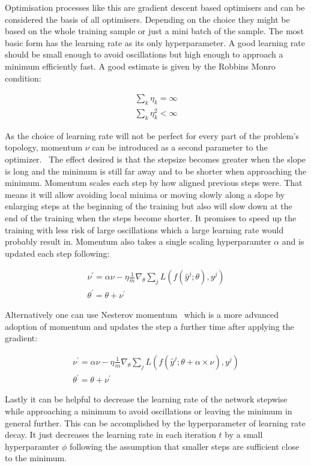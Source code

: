 Optimisation processes like this are gradient descent based optimisers and can be considered the basis of all optimisers. Depending on the choice they might be based on the whole training sample or just a mini batch of the sample. The most basic form has the learning rate as its only hyperparameter. A good learning rate should be small enough to avoid oscillations but high enough to approach a minimum efficiently fast. A good estimate is given by the Robbins Monro condition:

\begin{align}
    \sum_k \eta_k = \infty\\
    \sum_k \eta_k^2 < \infty
\end{align}

As the choice of learning rate will not be perfect for every part of the problem's topology, momentum $\nu$ can be introduced as a second parameter to the optimizer.~\cite{chollet2015keras} The effect desired is that the stepsize becomes greater when the slope is long and the minimum is still far away and to be shorter when approaching the minimum. Momentum scales each step by how aligned previous steps were. That means it will allow avoiding local minima or moving slowly along a slope by enlarging steps at the beginning of the training but also will slow down at the end of the training when the steps become shorter. It promises to speed up the training with less risk of large oscillations which a large learning rate would probably result in. Momentum also takes a single scaling hyperparamter $\alpha$ and is updated each step following: 

\begin{align}
    \nu^{\prime} = \alpha \nu - \eta \frac{1}{m} \nabla_{\theta} \sum_j L(f(\hat{y}^j; \theta), y^j)\\
    \theta^{\prime} = \theta + \nu^{\prime}
\end{align}

Alternatively one can use Nesterov momentum~\cite{chollet2015keras} which is a more advanced adoption of momentum and updates the step a further time after applying the gradient: 

\begin{align}
    \nu^{\prime} = \alpha \nu - \eta \frac{1}{m} \nabla_{\theta} \sum_j L(f(\hat{y}^j; \theta + \alpha \times \nu), y^j)\\
    \theta^{\prime} = \theta + \nu^{\prime}
\end{align}

Lastly it can be helpful to decrease the learning rate of the network stepwise while approaching a minimum to avoid oscillations or leaving the minimum in general further. This can be accomplished by the hyperparameter of learning rate decay. It just decreases the learning rate in each iteration $t$ by a small hyperparamter $\phi$ following the assumption that smaller steps are sufficient close to the minimum.~\cite{chollet2015keras}

